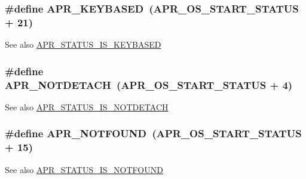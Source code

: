 \subsubsection[{\texorpdfstring{A\+P\+R\+\_\+\+K\+E\+Y\+B\+A\+S\+ED}{APR_KEYBASED}}]{\setlength{\rightskip}{0pt plus 5cm}\#define A\+P\+R\+\_\+\+K\+E\+Y\+B\+A\+S\+ED~({\bf A\+P\+R\+\_\+\+O\+S\+\_\+\+S\+T\+A\+R\+T\+\_\+\+S\+T\+A\+T\+US} + 21)}\hypertarget{group__APR__Error_gaac52bebace264494fa94cdf0b4344d26}{}\label{group__APR__Error_gaac52bebace264494fa94cdf0b4344d26}
\begin{DoxySeeAlso}{See also}
\hyperlink{group__APR__STATUS__IS_gaf43f4a40f5ab2fe196acb4e12f20b79e}{A\+P\+R\+\_\+\+S\+T\+A\+T\+U\+S\+\_\+\+I\+S\+\_\+\+K\+E\+Y\+B\+A\+S\+ED} 
\end{DoxySeeAlso}
\subsubsection[{\texorpdfstring{A\+P\+R\+\_\+\+N\+O\+T\+D\+E\+T\+A\+CH}{APR_NOTDETACH}}]{\setlength{\rightskip}{0pt plus 5cm}\#define A\+P\+R\+\_\+\+N\+O\+T\+D\+E\+T\+A\+CH~({\bf A\+P\+R\+\_\+\+O\+S\+\_\+\+S\+T\+A\+R\+T\+\_\+\+S\+T\+A\+T\+US} + 4)}\hypertarget{group__APR__Error_ga83b8407fb5de5840f51dfd2c1439987b}{}\label{group__APR__Error_ga83b8407fb5de5840f51dfd2c1439987b}
\begin{DoxySeeAlso}{See also}
\hyperlink{group__APR__STATUS__IS_ga3084551fdf84919e3c3db4384234521d}{A\+P\+R\+\_\+\+S\+T\+A\+T\+U\+S\+\_\+\+I\+S\+\_\+\+N\+O\+T\+D\+E\+T\+A\+CH} 
\end{DoxySeeAlso}
\subsubsection[{\texorpdfstring{A\+P\+R\+\_\+\+N\+O\+T\+F\+O\+U\+ND}{APR_NOTFOUND}}]{\setlength{\rightskip}{0pt plus 5cm}\#define A\+P\+R\+\_\+\+N\+O\+T\+F\+O\+U\+ND~({\bf A\+P\+R\+\_\+\+O\+S\+\_\+\+S\+T\+A\+R\+T\+\_\+\+S\+T\+A\+T\+US} + 15)}\hypertarget{group__APR__Error_ga9bd83273ff02f31f71fb4dc6f29df4a9}{}\label{group__APR__Error_ga9bd83273ff02f31f71fb4dc6f29df4a9}
\begin{DoxySeeAlso}{See also}
\hyperlink{group__APR__STATUS__IS_ga51bc0a0e249f5d09dba3ed9dc02c49e5}{A\+P\+R\+\_\+\+S\+T\+A\+T\+U\+S\+\_\+\+I\+S\+\_\+\+N\+O\+T\+F\+O\+U\+ND} 
\end{DoxySeeAlso}
